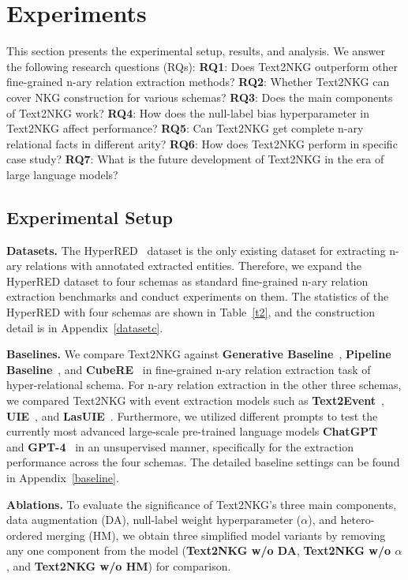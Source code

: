 \documentclass{article} \usepackage{iclr2024_conference,times}
\begin{document}
\section{Experiments}

This section presents the experimental setup, results, and analysis. We answer the following research questions (RQs):
\textbf{RQ1}: Does Text2NKG outperform other fine-grained n-ary relation extraction methods?
\textbf{RQ2}: Whether Text2NKG can cover NKG construction for various schemas?
\textbf{RQ3}: Does the main components of Text2NKG work?
\textbf{RQ4}: How does the null-label bias hyperparameter in Text2NKG affect performance?
\textbf{RQ5}: Can Text2NKG get complete n-ary relational facts in different arity?
\textbf{RQ6}: How does Text2NKG perform in specific case study?
\textbf{RQ7}: What is the future development of Text2NKG in the era of large language models?

\subsection{Experimental Setup}

\textbf{Datasets. }
The HyperRED~\citep{HyperRED} dataset is the only existing dataset for extracting n-ary relations with annotated extracted entities. Therefore, we expand the HyperRED dataset to four schemas as standard fine-grained n-ary relation extraction benchmarks and conduct experiments on them. The statistics of the HyperRED with four schemas are shown in Table~\ref{t2}, and the construction detail is in Appendix~\ref{datasetc}.

\textbf{Baselines. } We compare Text2NKG against \textbf{Generative Baseline}~\citep{BART}, \textbf{Pipeline Baseline}~\citep{UniRE}, and \textbf{CubeRE}~\citep{HyperRED} in fine-grained n-ary relation extraction task of hyper-relational schema. For n-ary relation extraction in the other three schemas, we compared Text2NKG with event extraction models such as \textbf{Text2Event}~\citep{Text2Event}, \textbf{UIE}~\citep{UIE}, and \textbf{LasUIE}~\citep{LasUIE}. Furthermore, we utilized different prompts to test the currently most advanced large-scale pre-trained language models \textbf{ChatGPT}~\citep{ChatGPT} and \textbf{GPT-4}~\citep{GPT-4} in an unsupervised manner, specifically for the extraction performance across the four schemas. The detailed baseline settings can be found in Appendix~\ref{baseline}.

\textbf{Ablations. } To evaluate the significance of Text2NKG's three main components, data augmentation (DA), null-label weight hyperparameter ($\alpha$), and hetero-ordered merging (HM), we obtain three simplified model variants by removing any one component from the model (\textbf{Text2NKG w/o DA}, \textbf{Text2NKG w/o $\alpha$}, and \textbf{Text2NKG w/o HM}) for comparison.
\end{document}
